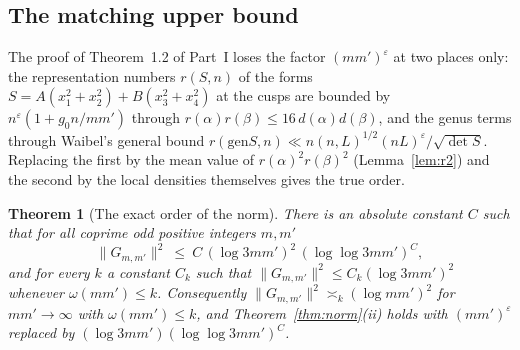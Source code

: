 ﻿\documentclass[11pt]{amsart}
\newtheorem{theorem}{Theorem}[section]
\theoremstyle{remark}
\newcommand{\e}{\varepsilon}
\newcommand{\gen}{\mathrm{gen}}
\newcommand{\rk}{r}
\begin{document}
\subsection{The matching upper bound}\label{subsec:upper}
The proof of Theorem~1.2 of Part~I loses the factor $(mm')^\e$ at two places only: the representation numbers $r(S,n)$ of the forms $S=A(x_1^2+x_2^2)+B(x_3^2+x_4^2)$ at the cusps are bounded by $n^\e(1+g_0n/mm')$ through $r(\alpha)r(\beta)\le16\,d(\alpha)d(\beta)$, and the genus terms through Waibel's general bound $\rk(\gen S,n)\ll n(n,L)^{1/2}(nL)^\e/\sqrt{\det S}$. Replacing the first by the mean value of $r(\alpha)^2r(\beta)^2$ (Lemma~\ref{lem:r2}) and the second by the local densities themselves gives the true order.

\begin{theorem}[The exact order of the norm]\label{thm:upper}
There is an absolute constant $C$ such that for all coprime odd positive integers $m,m'$
\[
\|G_{m,m'}\|^2\ \le\ C\,(\log3mm')^2\,(\log\log3mm')^{C},
\]
and for every $k$ a constant $C_k$ such that $\|G_{m,m'}\|^2\le C_k(\log3mm')^2$ whenever $\omega(mm')\le k$. Consequently $\|G_{m,m'}\|^2\asymp_k(\log mm')^2$ for $mm'\to\infty$ with $\omega(mm')\le k$, and Theorem~\ref{thm:norm}(ii) holds with $(mm')^\e$ replaced by $(\log3mm')(\log\log3mm')^{C}$.
\end{theorem}
\end{document}

